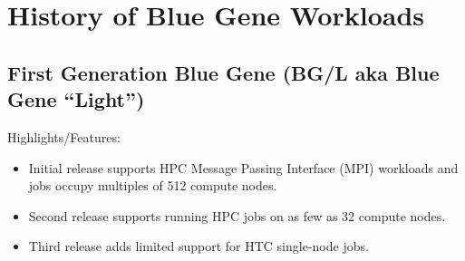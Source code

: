 \section{History of Blue Gene Workloads}

\subsection{First Generation Blue Gene (BG/L aka Blue Gene ``Light'')}
\label{sec:BGL}

Highlights/Features:
\begin{itemize}
\item Initial release supports HPC Message Passing Interface (MPI) workloads and jobs occupy multiples of 512 compute nodes.
\item Second release supports running HPC jobs on as few as 32 compute nodes.
\item Third release adds limited support for HTC single-node jobs.
\end{itemize}

